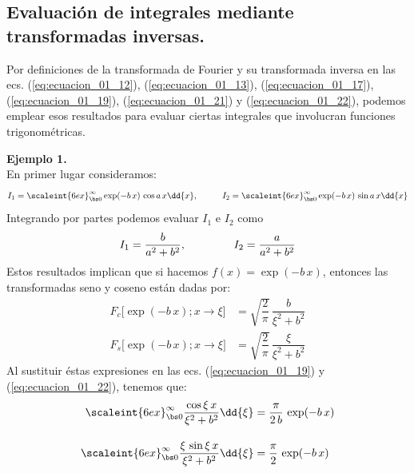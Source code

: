 \subsection{Evaluación de integrales mediante transformadas inversas.}

Por definiciones de la transformada de Fourier y su transformada inversa en las ecs. (\ref{eq:ecuacion_01_12}), (\ref{eq:ecuacion_01_13}), (\ref{eq:ecuacion_01_17}), (\ref{eq:ecuacion_01_19}), (\ref{eq:ecuacion_01_21}) y (\ref{eq:ecuacion_01_22}), podemos emplear esos resultados para evaluar ciertas integrales que involucran funciones trigonométricas. 
\bigskip

\noindent
\textbf{Ejemplo 1.}
\\
En primer lugar consideramos:
\begin{align*}
I_{1} = \scaleint{6ex}_{\bs 0}^{\infty} \exp (-b \, x) \, \cos a \, x \dd{x}, \hspace{1cm} I_{2} = \scaleint{6ex}_{\bs 0}^{\infty} \exp (-b \, x) \, \sin a \, x \dd{x}
\end{align*}
Integrando por partes podemos evaluar $I_{1}$ e $I_{2}$ como
\begin{align*}
I_{1} = \dfrac{b}{a^{2} + b^{2}},  \hspace{1.5cm} I_{2} = \dfrac{a}{a^{2} + b^{2}}
\end{align*}
Estos resultados implican que si hacemos $f (x) = \exp(-b \, x)$, entonces las transformadas seno y coseno están dadas por:
\begin{align*}
F_{c} \big[ \exp(-b \, x); x \to \xi \big] &= \sqrt{\dfrac{2}{\pi}} \, \dfrac{b}{\xi^{2} + b^{2}} \\[0.5em]
F_{s} \big[ \exp(-b \, x); x \to \xi \big] &= \sqrt{\dfrac{2}{\pi}} \, \dfrac{\xi}{\xi^{2} + b^{2}}
\end{align*}
Al sustituir éstas expresiones en las ecs. (\ref{eq:ecuacion_01_19}) y (\ref{eq:ecuacion_01_22}), tenemos que:
\begin{align*}
\scaleint{6ex}_{\bs 0}^{\infty} \dfrac{\cos \xi \, x}{\xi^{2} + b^{2}} \dd{\xi} &= \dfrac{\pi}{2 \, b} \, \exp(-b \, x) \\[1em]
\scaleint{6ex}_{\bs 0}^{\infty} \dfrac{\xi \, \sin \xi \, x}{\xi^{2} + b^{2}} \dd{\xi} &= \dfrac{\pi}{2} \, \exp(-b \, x)
\end{align*}
\bigskip

